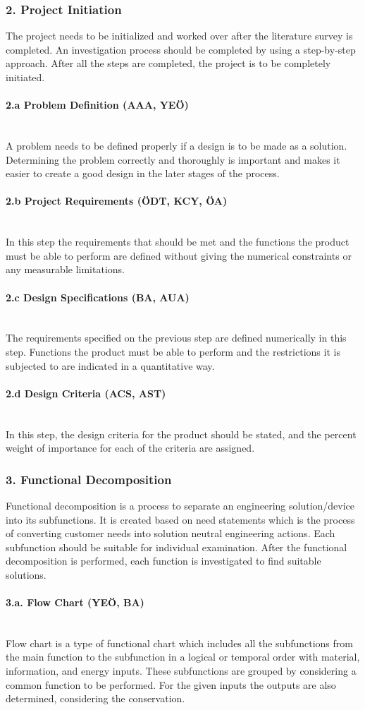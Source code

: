 \documentclass[12pt]{article}
\newcommand{\paragraphs}[1]{\paragraph*{#1}\mbox{}\\}
\begin{document}
\subsubsection*{2. Project Initiation}
The project needs to be initialized and worked over after the literature survey is completed. An investigation process should be completed by using a step-by-step approach. After all the steps are completed, the project is to be completely initiated.

\paragraphs{2.a Problem Definition (AAA, YEÖ)}
A problem needs to be defined properly if a design is to be made as a solution. Determining the problem correctly and thoroughly is important and makes it easier to create a good design in the later stages of the process.

\paragraphs{2.b Project Requirements (ÖDT, KCY, ÖA)}
 In this step the requirements that should be met and the functions the product must be able to perform are defined without giving the numerical constraints or any measurable limitations. 

\paragraphs{2.c Design Specifications (BA, AUA)}
The requirements specified on the previous step are defined numerically in this step. Functions the product must be able to perform and the restrictions it is subjected to are indicated in a quantitative way.  

\paragraphs{2.d Design Criteria (ACS, AST)}
In this step, the design criteria for the product should be stated, and the percent weight of importance for each of the criteria are assigned. 

\subsubsection*{3. Functional Decomposition}
Functional decomposition is a process to separate an engineering solution/device into its subfunctions. It is created based on need statements which is the process of converting customer needs into solution neutral engineering actions. Each subfunction should be suitable for individual examination. After the functional decomposition is performed, each function is investigated to find suitable solutions. 

\paragraphs{3.a. Flow Chart (YEÖ, BA)}
Flow chart is a type of functional chart which includes all the subfunctions from the main function to the subfunction in a logical or temporal order with material, information, and energy inputs. These subfunctions are grouped by considering a common function to be performed. For the given inputs the outputs are also determined, considering the conservation.  
\end{document}
